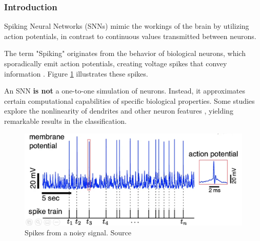 \begin{frame}[allowframebreaks]
	\frametitle{Introduction}
	\par Spiking Neural Networks (SNNs) mimic the workings of the brain by utilizing action potentials, in contrast to continuous values transmitted between neurons.
	
	\par The term "Spiking" originates from the behavior of biological neurons, which sporadically emit action potentials, creating voltage spikes that convey information \cite{kasabov2019time}. Figure \ref{fig:neuronspikes} illustrates these spikes.
	
	\par An SNN \textbf{is not} a one-to-one simulation of neurons. Instead, it approximates certain computational capabilities of specific biological properties. Some studies explore the nonlinearity of dendrites and other neuron features \cite{jones2020single}, yielding remarkable results in the classification.
	
	\begin{figure}[H]
		\centering
		\includegraphics[width=\linewidth]{images/neuronSpikes}
		\caption{Spikes from a noisy signal. Source \cite{dan_goodman_2022_7044500}}
		\label{fig:neuronspikes}
	\end{figure}
\end{frame}

